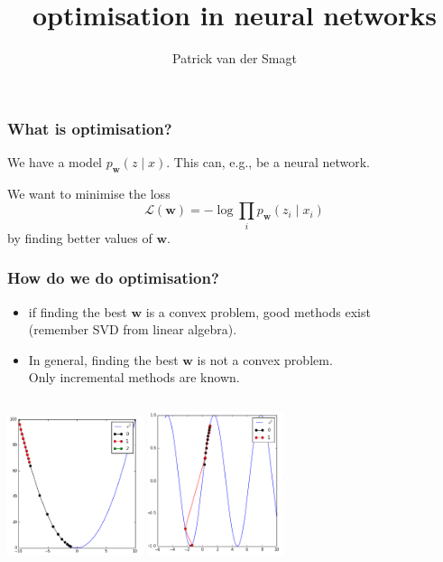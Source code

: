 \documentclass[USenglish,pdftex,compress,10pt,svgnamesi,handout]{beamer}
\title{optimisation in neural networks}
\author{Patrick van der Smagt}
\date{}
\def\Vec#1{\textbf{#1}}
\begin{document}
\begin{frame}
	\titlepage
	
	\vfil
\end{frame}


\begin{frame}
\frametitle{What is optimisation?}
We have a model $p_{\Vec w}(z\mid x)$.  This can, e.g., be a neural network.

We want to minimise the loss
$$
    \mathcal{L}(\Vec w) = -\log \prod_i p_{\Vec w}(z_i \mid x_i)
$$
by finding better values of $\Vec w$.

\end{frame}

\begin{frame}
\frametitle{How do we do optimisation?}
\begin{itemize}
\item if finding the best $\Vec w$ is a convex problem, good methods exist \\(remember SVD from linear algebra).

\item In general, finding the best $\Vec w$ is not a convex problem.  \\Only incremental methods are known.
\end{itemize}
\begin{columns}
\column{5cm}
\includegraphics[width=4cm]{convex}
\column{5cm}
\includegraphics[width=4cm]{nonvex}
\end{columns}

\end{frame}
\end{document}
